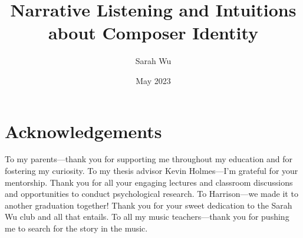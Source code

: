 \documentclass[12pt,twoside]{reedthesis}
\title{Narrative Listening and Intuitions about Composer Identity}
\author{Sarah Wu}
\date{May 2023}
\begin{document}
  \maketitle
  \frontmatter %
  \pagestyle{empty} %

    \chapter*{Acknowledgements}
	To my parents—thank you for supporting me throughout my education and for fostering my curiosity. To my thesis advisor Kevin Holmes—I'm grateful for your mentorship. Thank you for all your engaging lectures and classroom discussions and opportunities to conduct psychological research. To Harrison—we made it to another graduation together! Thank you for your sweet dedication to the Sarah Wu club and all that entails. To all my music teachers—thank you for pushing me to search for the story in the music.
	

	
	


	
\end{document}
